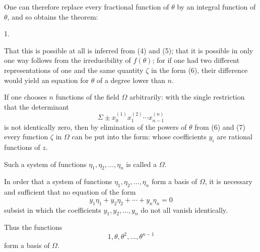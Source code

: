 One can therefore replace every fractional function of $\theta$ by an integral function of $\theta$, and so obtains the theorem:

1. 

That this is possible at all is inferred from (4) and (5); that it is possible in only one way follows from the irreducibility of $f(\theta)$; for if one had two different representations of one and the same quantity $\zeta$ in the form (6), their difference would yield an equation for $\theta$ of a degree lower than $n$.

If one chooses $n$ functions of the field $\Omega$ arbitrarily:
with the single restriction that the determinant
\[
\Sigma \pm x_0^{(1)} x_1^{(2)} \cdots x_{n-1}^{(n)}
\]
is not identically zero, then by elimination of the powers of $\theta$ from (6) and (7) every function $\zeta$ in $\Omega$ can be put into the form:
whose coefficients $y_i$ are rational functions of $z$.

Such a system of functions $\eta_1, \eta_2, \ldots, \eta_n$ is called a  $\Omega$.

In order that a system of functions $\eta_1, \eta_2, \ldots, \eta_n$ form a basis of $\Omega$, it is necessary and sufficient that no equation of the form
\[
y_1\eta_1 + y_2\eta_2 + \cdots + y_n\eta_n = 0
\]
subsist in which the coefficients $y_1, y_2, \ldots, y_n$ do not all vanish identically.

Thus the functions
\[
1, \theta, \theta^2, \ldots, \theta^{n-1}
\]
form a basis of $\Omega$.
